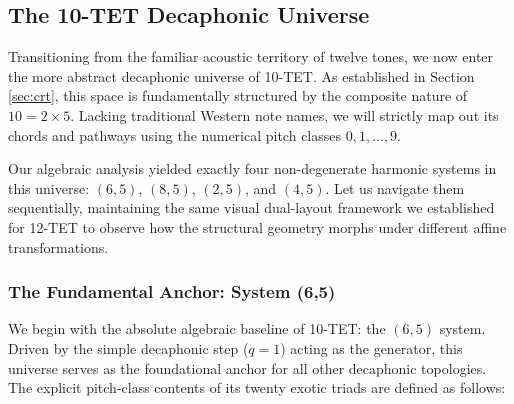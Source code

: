 \documentclass[11pt,letterpaper]{amsart}
\begin{document}
\subsection{The 10-TET Decaphonic Universe}

Transitioning from the familiar acoustic territory of twelve tones, we now enter the more abstract decaphonic universe of 10-TET. As established in Section \ref{sec:crt}, this space is fundamentally structured by the composite nature of $10 = 2 \times 5$. Lacking traditional Western note names, we will strictly map out its chords and pathways using the numerical pitch classes $0, 1, \dots, 9$. 

Our algebraic analysis yielded exactly four non-degenerate harmonic systems in this universe: $(6,5)$, $(8,5)$, $(2,5)$, and $(4,5)$. Let us navigate them sequentially, maintaining the same visual dual-layout framework we established for 12-TET to observe how the structural geometry morphs under different affine transformations.

\subsubsection{The Fundamental Anchor: System (6,5)}

We begin with the absolute algebraic baseline of 10-TET: the $(6,5)$ system. Driven by the simple decaphonic step ($q = 1$) acting as the generator, this universe serves as the foundational anchor for all other decaphonic topologies. The explicit pitch-class contents of its twenty exotic triads are defined as follows:
\end{document}
